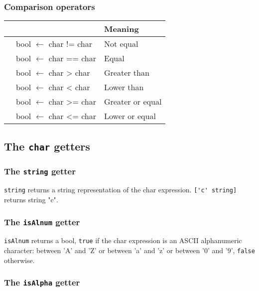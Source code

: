 \documentclass[10pt,openright,twosides,final]{memoir}
\newcommand{\ccst}[1]{{\footnotesize\ttfamily\colorbox{light-blue}{'#1'}}}
\newcommand{\scst}[1]{{\footnotesize\ttfamily\colorbox{light-blue}{"#1"}}}
\newcommand{\gtlinline}[1]{\colorbox{light-blue}{\lstinline[language=gtl]{#1}}}
\begin{document}
\subsubsection{Comparison operators}

\begin{longtable}{>{\ttfamily}l|>{\ttfamily}l|l}
{\bfseries Operator}&{\bfseries Expression type}&{\bfseries Meaning}\\
\hline\endhead
 {!=}&
  {bool $\leftarrow$ char != char}&
  {Not equal}\\
 {==}&
  {bool $\leftarrow$ char == char}&
  {Equal}\\
 {>}&
  {bool $\leftarrow$ char > char}&
  {Greater than}\\
 {<}&
  {bool $\leftarrow$ char < char}&
  {Lower than}\\
 {>=}&
  {bool $\leftarrow$ char >= char}&
  {Greater or equal}\\
 {<=}&
  {bool $\leftarrow$ char <= char}&
  {Lower or equal}\\
\end{longtable}

\subsection{The \texttt{char} getters}

\subsubsection{The \texttt{string} getter}

\gtlinline{string} returns a string representation of the char expression. \gtlinline{['c' string]} returns string \scst{c}.

\subsubsection{The \texttt{isAlnum} getter}

\gtlinline{isAlnum} returns a bool, \gtlinline{true} if the char expression is an ASCII alphanumeric character: between \ccst{A} and \ccst{Z} or between \ccst{a} and \ccst{z} or between \ccst{0} and \ccst{9}, \gtlinline{false} otherwise.

\subsubsection{The \texttt{isAlpha} getter}
\end{document}
